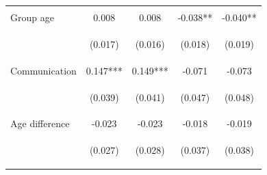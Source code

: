 \documentclass{article} %
\begin{document}
\begin{table}[H]
\begin{center}
\begin{tabular}{lcccc}
\vspace{4pt} & \begin{footnotesize}\end{footnotesize} & \begin{footnotesize}\end{footnotesize} & \begin{footnotesize}\end{footnotesize} & \begin{footnotesize}\end{footnotesize} \\
Group age & 0.008 & 0.008 & -0.038** & -0.040** \\
\vspace{4pt} & \begin{footnotesize}(0.017)\end{footnotesize} & \begin{footnotesize}(0.016)\end{footnotesize} & \begin{footnotesize}(0.018)\end{footnotesize} & \begin{footnotesize}(0.019)\end{footnotesize} \\
Communication & 0.147*** & 0.149*** & -0.071 & -0.073 \\
\vspace{4pt} & \begin{footnotesize}(0.039)\end{footnotesize} & \begin{footnotesize}(0.041)\end{footnotesize} & \begin{footnotesize}(0.047)\end{footnotesize} & \begin{footnotesize}(0.048)\end{footnotesize} \\
Age difference & -0.023 & -0.023 & -0.018 & -0.019 \\
\vspace{4pt} & \begin{footnotesize}(0.027)\end{footnotesize} & \begin{footnotesize}(0.028)\end{footnotesize} & \begin{footnotesize}(0.037)\end{footnotesize} & \begin{footnotesize}(0.038)\end{footnotesize} \\

\end{tabular}
\end{center}
\end{table}
\end{document}
